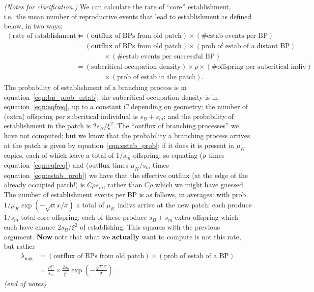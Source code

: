 \documentclass{article}
\newcommand{\migrate}{\lambda_\text{mig}}
\newcommand{\plr}[1]{{\it\color{blue}(#1)}}
\begin{document}
\plr{Notes for clarification.}
We can calculate the rate of ``core'' establishment, i.e.\ the mean number of reproductive events that lead to establishment as defined below, in two ways:
\begin{align}
  (\mbox{rate of establishment}) &= (\mbox{outflux of BPs from old patch}) \times (\mbox{\# estab events per BP}) \\
  &= (\mbox{outflux of BPs from old patch}) \times (\mbox{prob of estab of a distant BP}) \\
  & \qquad \qquad \times (\mbox{\# estab events per successful BP}) \\
  &= (\mbox{subcritical occupation density}) \times \rho \times (\mbox{\# offspring per subcritical indiv}) \\
  & \qquad \qquad \times (\mbox{prob of estab in the patch}) .
\end{align}
The probability of establishment of a branching process is in equation~\eqref{eqn:bp_prob_estab};
the subcritical occupation density is in equation~\eqref{eqn:eqfreq}, up to a constant $C$ depending on geometry;
the number of (extra) offspring per subcritical individual is $s_B+s_m$;
and the probability of establishment in the patch is $2s_B/\xi^2$.
The ``outflux of branching processes'' we have not computed;
but we know that the probability a branching process arrives at the patch is given by equation~\eqref{eqn:estab_prob};
if it does it is present in $\mu_K$ copies, each of which leave a total of $1/s_m$ offspring; 
so equating ($\rho$ times equation~\eqref{eqn:eqfreq}) and (outflux times $\mu_K/s_m$ times equation~\eqref{eqn:estab_prob})
we have that the effective outflux (at the edge of the already occupied patch!) is $C \rho s_m$,
rather than $C\rho$ which we might have guessed.
The number of establishment events per BP is as follows, in averages: 
with prob $1/\mu_K \exp(-\sqrt{\alpha} x/ \sigma)$ a total of $\mu_K$ indivs arrive at the new patch; 
each produce $1/s_m$ total core offspring;
each of these produce $s_B+s_m$ extra offspring which each have chance $2s_B/\xi^2$ of establishing.
This squares with the previous argument.
\textbf{Now} note that what we \textbf{actually} want to compute is not this rate, but rather 
\begin{align}
  \migrate &= (\mbox{outflux of BPs from old patch}) \times (\mbox{prob of estab of a BP}) \\
  &= \frac{\rho C}{s_m} \times \frac{2 s_b}{\xi^2} \exp\left(- \frac{\sqrt{\alpha}x}{\sigma} \right) .
\end{align}
\plr{end of notes}
\end{document}
